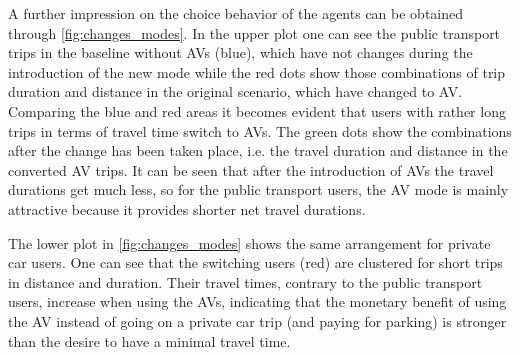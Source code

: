 A further impression on the choice behavior of the agents can be obtained through
\cref{fig:changes_modes}. In the upper plot one can see the public transport trips
in the baseline without AVs (blue), which have not changes during the introduction
of the new mode while the red dots show those combinations of trip duration and
distance in the original scenario, which have changed to AV. Comparing the blue
and red areas it becomes evident that users with rather long trips in terms of
travel time switch to AVs. The green dots show the combinations after the change
has been taken place, i.e. the travel duration and distance in the converted AV
trips. It can be seen that after the introduction of AVs the travel durations
get much less, so for the public transport users, the AV mode is mainly attractive
because it provides shorter net travel durations.

The lower plot in \cref{fig:changes_modes} shows the same arrangement for private
car users. One can see that the switching users (red) are clustered for short trips in
distance and duration. Their travel times, contrary to the public transport users,
increase when using the AVs, indicating that the monetary benefit of using the AV
instead of going on a private car trip (and paying for parking) is stronger than
the desire to have a minimal travel time.


